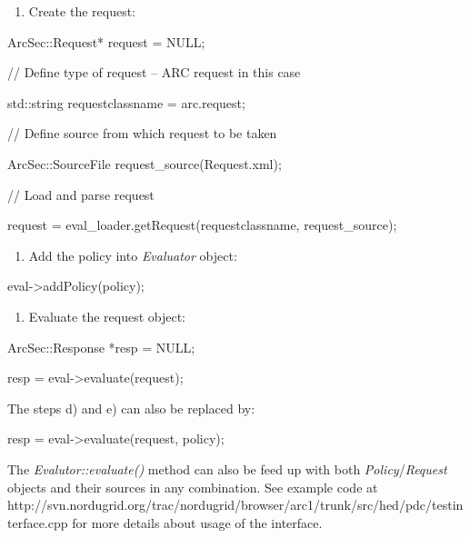 \documentclass{article}
\newcommand\liststyleWWviiiNumv{%
\renewcommand\theenumi{\alph{enumi}}
\renewcommand\theenumii{\arabic{enumii}}
\renewcommand\theenumiii{\arabic{enumiii}}
\renewcommand\theenumiv{\arabic{enumiv}}
\renewcommand\labelenumi{\theenumi)}
\renewcommand\labelenumii{\theenumii.}
\renewcommand\labelenumiii{\theenumiii.}
\renewcommand\labelenumiv{\theenumiv.}
}
\newcommand\liststyleWWviiiNumvi{%
\renewcommand\theenumi{\alph{enumi}}
\renewcommand\theenumii{\arabic{enumii}}
\renewcommand\theenumiii{\arabic{enumiii}}
\renewcommand\theenumiv{\arabic{enumiv}}
\renewcommand\labelenumi{\theenumi)}
\renewcommand\labelenumii{\theenumii.}
\renewcommand\labelenumiii{\theenumiii.}
\renewcommand\labelenumiv{\theenumiv.}
}
\newcommand\liststyleWWviiiNumvii{%
\renewcommand\theenumi{\alph{enumi}}
\renewcommand\theenumii{\arabic{enumii}}
\renewcommand\theenumiii{\arabic{enumiii}}
\renewcommand\theenumiv{\arabic{enumiv}}
\renewcommand\labelenumi{\theenumi)}
\renewcommand\labelenumii{\theenumii.}
\renewcommand\labelenumiii{\theenumiii.}
\renewcommand\labelenumiv{\theenumiv.}
}
\begin{document}
\liststyleWWviiiNumv
\begin{enumerate}
\item {\color{black}
Create the request:}
\end{enumerate}
{\ttfamily\color{black}
ArcSec::Request* request = NULL;}

{\ttfamily\color{black}
// Define type of request -- ARC request in this case}

{\ttfamily\color{black}
std::string requestclassname =
{\textquotedbl}arc.request{\textquotedbl};}

{\ttfamily\color{black}
// Define source from which request to be taken}

{\ttfamily\color{black}
ArcSec::SourceFile
request\_source({\textquotedbl}Request.xml{\textquotedbl});}

{\ttfamily\color{black}
// Load and parse request}

{\ttfamily\color{black}
request = eval\_loader.getRequest(requestclassname, request\_source);}

\liststyleWWviiiNumvi
\begin{enumerate}
\item {\color{black}
Add the policy into \textit{Evaluator} object:}
\end{enumerate}
{\ttfamily\color{black}
eval-{\textgreater}addPolicy(policy);}

\liststyleWWviiiNumvii
\begin{enumerate}
\item {\color{black}
Evaluate the request object:}
\end{enumerate}
{\ttfamily\color{black}
ArcSec::Response *resp = NULL;}

{\ttfamily\color{black}
resp = eval-{\textgreater}evaluate(request);}

{\color{black}
The steps d) and e) can also be replaced by:}

{\ttfamily\color{black}
resp = eval-{\textgreater}evaluate(request, policy);}


\bigskip

{\upshape\color{black}
The \textit{Evalutor::evaluate()} method can also be feed up with both
\textit{Policy}/\textit{Request} objects and their sources in any
combination. See example code at
http://svn.nordugrid.org/trac/nordugrid/browser/arc1/trunk/src/hed/pdc/testinterface.cpp
for more details about usage of the interface.}
\end{document}
